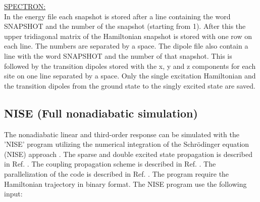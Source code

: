 \noindent
\underline{SPECTRON:}\\
In the energy file each snapshot is stored after a line containing the word SNAPSHOT
and the number of the snapshot (starting from 1). After this the upper tridiagonal
matrix of the Hamiltonian snapshot is stored with one row on each line. The numbers
are separated by a space. The dipole file also contain a line with the word SNAPSHOT
and the number of that snapshot. This is followed by the transition dipoles stored
with the x, y and z components for each site on one line separated by a space. Only
the single excitation Hamiltonian and the transition dipoles from the ground state to
the singly excited state are saved.


\subsection{NISE (Full nonadiabatic simulation)}
The nonadiabatic linear and third-order response can be simulated with the 'NISE'
program utilizing the numerical integration of the Schr\"odinger equation (NISE)
approach \cite{Jansen.2006.JPCB.110.22910,Jansen.2009.ACR.42.1405}. The sparse and
double excited state propagation is described in Ref. .
The coupling propagation scheme is described in Ref. .
The parallelization of the code is described in Ref. .
The program require the Hamiltonian trajectory in binary format.
The NISE program use the following input:\\
